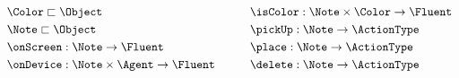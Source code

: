 \begin{equation*}
    \begin{aligned}\
        & \Color \sqsubset \Object \\
        & \Note \sqsubset \Object \\
        & \onScreen: \Note \rightarrow \Fluent \\
        & \onDevice: \Note \times \Agent \rightarrow \Fluent \\
    \end{aligned}
    \hspace{30pt}
    \begin{aligned}
        & \isColor: \Note \times \Color \rightarrow \Fluent \\
        & \pickUp: \Note \rightarrow \ActionType \\
        & \place: \Note \rightarrow \ActionType \\
        & \delete: \Note \rightarrow \ActionType \\ 
    \end{aligned}
\end{equation*}
